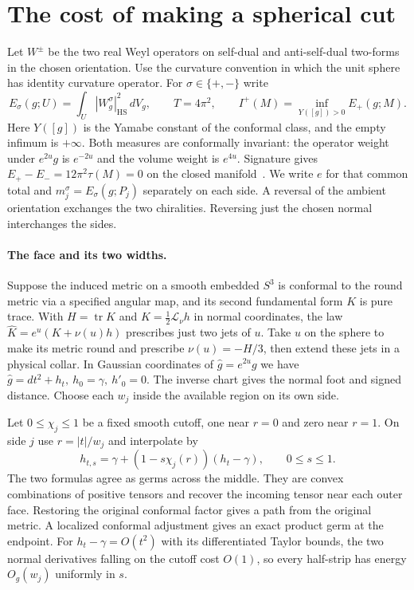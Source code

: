 \documentclass[11pt,letterpaper]{article}
\numberwithin{equation}{section}
\newcommand{\HS}{\mathrm{HS}}
\begin{document}
\section{The cost of making a spherical cut}\label{sec:cost}

Let \(W^\pm\) be the two real Weyl operators on self-dual and
anti-self-dual two-forms in the chosen orientation. Use the curvature
convention in which the unit sphere has identity curvature operator.
For \(\sigma\in\{+,-\}\) write
\[
 E_\sigma(g;U)=\int_U |W^\sigma_g|_{\HS}^2\,dV_g,\qquad
 T=4\pi^2,\qquad I^+(M)=\inf_{Y([g])>0}E_+(g;M).
\]
Here \(Y([g])\) is the Yamabe constant of the conformal class, and the
empty infimum is \(+\infty\). Both measures are conformally invariant:
the operator weight under \(e^{2u}g\) is \(e^{-2u}\) and the volume
weight is \(e^{4u}\). Signature gives \(E_+-E_-=12\pi^2\tau(M)=0\)
on the closed manifold~\cite{Hirzebruch1971Signature}. We write \(e\)
for that common total and \(m_j^\sigma=E_\sigma(g;P_j)\) separately
on each side. A reversal of the ambient orientation exchanges the two
chiralities. Reversing just the chosen normal interchanges the sides.

\paragraph{The face and its two widths.}
Suppose the induced metric on a smooth embedded \(S^3\) is conformal
to the round metric via a specified angular map, and its second
fundamental form \(K\) is pure trace. With \(H=\operatorname{tr}K\)
and \(K=\tfrac12\mathcal L_\nu h\) in normal coordinates, the law
\(\widehat K=e^u(K+\nu(u)h)\) prescribes just two jets of \(u\).
Take \(u\) on the sphere to make its metric round and prescribe
\(\nu(u)=-H/3\), then extend these jets in a physical collar.
In Gaussian coordinates of \(\widehat g=e^{2u}g\) we have
\(\widehat g=dt^2+h_t,\ h_0=\gamma,\ h'_0=0\).
The inverse chart gives the normal foot and signed distance. Choose
each \(w_j\) inside the available region on its own side.

Let \(0\le\chi_j\le1\) be a fixed smooth cutoff, one near \(r=0\) and zero
near \(r=1\). On side \(j\) use \(r=|t|/w_j\) and interpolate by
\[
 h_{t,s}=\gamma+(1-s\chi_j(r))(h_t-\gamma),\qquad 0\le s\le1.
\]
The two formulas agree as germs across the middle. They are convex
combinations of positive tensors and recover the incoming tensor near
each outer face. Restoring the original conformal factor gives a
path from the original metric. A localized conformal adjustment
gives an exact product germ at the endpoint. For \(h_t-\gamma=O(t^2)\)
with its differentiated Taylor bounds, the two normal derivatives
falling on the cutoff cost \(O(1)\), so every half-strip has energy
\(O_g(w_j)\) uniformly in \(s\).
\end{document}
